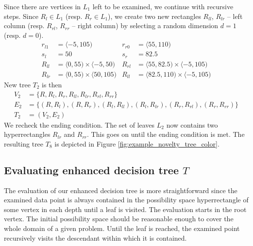 \begin{example}
    Since there are vertices in $L_1$ left to be examined, we continue with recursive steps.
    Since $R_l \in L_1$ (resp. $R_r \in L_1$), we create two new rectangles $R_{ll}$, $R_{lr}$ -- left column (resp. $R_{rl}$, $R_{rr}$ -- right column) by selecting a random dimension $d=1$ (resp. $d=0$).
    \begin{align*}
        r_{l1} &= \langle -5, 105)& r_{r0} &= \langle 55, 110) \\
        s_l &= 50 & s_r&=82.5\\
        R_{ll} &= \langle 0, 55) \times \langle -5,50) & R_{rl} &= \langle 55, 82.5) \times \langle -5,105)\\
        R_{lr} &= \langle 0, 55) \times \langle 50,105) & R_{ll} &= \langle 82.5, 110) \times \langle -5,105)
    \end{align*}
 New tree $T_2$ is then
    \begin{align*}
        V_2 &= \{R, R_l, R_r, R_{ll}, R_{lr}, R_{rl}, R_{rr}\} \\
        E_2 &= \{(R, R_l), (R, R_r), (R_l, R_{ll}), (R_l, R_{lr}), (R_r, R_{rl}), (R_r, R_{rr})\} \\
        T_2 &= (V_2, E_2)
    \end{align*}
We recheck the ending condition. The set of leaves $L_2$ now contains two hyperrectangles $R_{lr}$ and $R_{rr}$.
This goes on until the ending condition is met. The resulting tree $T_8$ is depicted in Figure \ref{fig:example_novelty_tree_color}.
\end{example}

\subsection{Evaluating enhanced decision tree $T$}
The evaluation of our enhanced decision tree is more straightforward since the examined data point is always contained in the possibility space hyperrectangle of some vertex in each depth until a leaf is visited.
The evaluation starts in the root vertex. The initial possibility space should be reasonable enough to cover the whole domain of a given problem. Until the leaf is reached, the examined point recursively visits the descendant within which it is contained.



